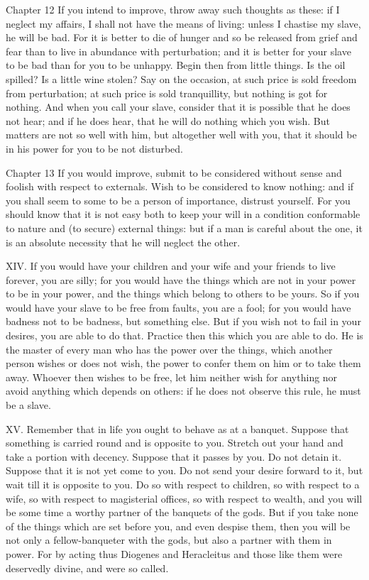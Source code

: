 Chapter 12 If you intend to improve, throw away such thoughts as these: if I neglect my affairs, I shall not have the means of living: unless I chastise my slave, he will be bad. For it is better to die of hunger and so be released from grief and fear than to live in abundance with perturbation; and it is better for your slave to be bad than for you to be unhappy. Begin then from little things. Is the oil spilled? Is a little wine stolen? Say on the occasion, at such price is sold freedom from perturbation; at such price is sold tranquillity, but nothing is got for nothing. And when you call your slave, consider that it is possible that he does not hear; and if he does hear, that he will do nothing which you wish. But matters are not so well with him, but altogether well with you, that it should be in his power for you to be not disturbed.



Chapter 13 If you would improve, submit to be considered without sense and foolish with respect to externals. Wish to be considered to know nothing: and if you shall seem to some to be a person of importance, distrust yourself. For you should know that it is not easy both to keep your will in a condition conformable to nature and (to secure) external things: but if a man is careful about the one, it is an absolute necessity that he will neglect the other.



XIV. If you would have your children and your wife and your friends to live forever, you are silly; for you would have the things which are not in your power to be in your power, and the things which belong to others to be yours. So if you would have your slave to be free from faults, you are a fool; for you would have badness not to be badness, but something else. But if you wish not to fail in your desires, you are able to do that. Practice then this which you are able to do. He is the master of every man who has the power over the things, which another person wishes or does not wish, the power to confer them on him or to take them away. Whoever then wishes to be free, let him neither wish for anything nor avoid anything which depends on others: if he does not observe this rule, he must be a slave.



XV. Remember that in life you ought to behave as at a banquet. Suppose that something is carried round and is opposite to you. Stretch out your hand and take a portion with decency. Suppose that it passes by you. Do not detain it. Suppose that it is not yet come to you. Do not send your desire forward to it, but wait till it is opposite to you. Do so with respect to children, so with respect to a wife, so with respect to magisterial offices, so with respect to wealth, and you will be some time a worthy partner of the banquets of the gods. But if you take none of the things which are set before you, and even despise them, then you will be not only a fellow-banqueter with the gods, but also a partner with them in power. For by acting thus Diogenes and Heracleitus and those like them were deservedly divine, and were so called.



